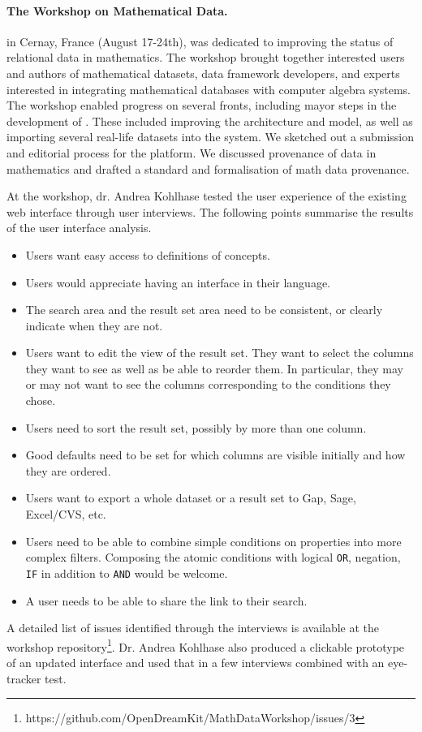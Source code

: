 \paragraph{The Workshop on Mathematical Data.}
 in Cernay, France (August 17-24th),
was dedicated to improving the status of relational data in mathematics.
The workshop brought together interested users and authors of mathematical datasets, 
data framework developers, 
and experts interested in integrating mathematical databases with computer algebra systems.
The workshop enabled progress on several fronts,
including mayor steps in the development of \dmh.
These included improving the architecture and model, 
as well as importing several real-life datasets into the system.
We sketched out a submission and editorial process for the platform.
We discussed provenance of data in mathematics and
drafted a standard and formalisation of math data provenance.

At the workshop, dr. Andrea Kohlhase tested the user experience 
of the existing web interface through user interviews.
The following points summarise the results of the user interface analysis.
\begin{itemize}
\item Users want easy access to definitions of concepts.
\item Users would appreciate having an interface in their language.
\item The search area and the result set area need to be consistent, or clearly indicate when they are not.
\item Users want to edit the view of the result set.
They want to select the columns they want to see as well as be able to reorder them.
In particular, they may or may not want to see the columns corresponding to the conditions they chose.
\item Users need to sort the result set, possibly by more than one column.
\item Good defaults need to be set for which columns are visible initially and how they are ordered.
\item Users want to export a whole dataset or a result set to Gap, Sage, Excel/CVS, etc.
\item Users need to be able to combine simple conditions on properties into more complex filters.
Composing the atomic conditions with logical \texttt{OR}, negation, \texttt{IF} in addition to \texttt{AND} would be welcome.
\item A user needs to be able to share the link to their search.
\end{itemize}
A detailed list of issues identified through the interviews is available at the 
workshop repository\footnote{https://github.com/OpenDreamKit/MathDataWorkshop/issues/3}.
Dr. Andrea Kohlhase also produced a clickable prototype of an updated interface
and used that in a few interviews combined with an eye-tracker test.

